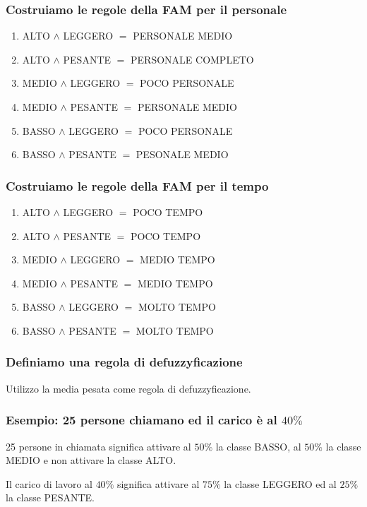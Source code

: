 \documentclass[\main/main.tex]{subfiles}
\begin{document}
\subsubsection*{Costruiamo le regole della FAM per il personale}
\begin{enumerate}
  \item ALTO  $\land$ LEGGERO $=$ PERSONALE MEDIO
  \item ALTO  $\land$ PESANTE $=$ PERSONALE COMPLETO
  \item MEDIO $\land$ LEGGERO $=$ POCO PERSONALE
  \item MEDIO $\land$ PESANTE $=$ PERSONALE MEDIO
  \item BASSO $\land$ LEGGERO $=$ POCO PERSONALE
  \item BASSO $\land$ PESANTE $=$ PESONALE MEDIO
\end{enumerate}

\subsubsection*{Costruiamo le regole della FAM per il tempo}
\begin{enumerate}
  \item ALTO  $\land$ LEGGERO $=$ POCO TEMPO
  \item ALTO  $\land$ PESANTE $=$ POCO TEMPO
  \item MEDIO $\land$ LEGGERO $=$ MEDIO TEMPO
  \item MEDIO $\land$ PESANTE $=$ MEDIO TEMPO
  \item BASSO $\land$ LEGGERO $=$ MOLTO TEMPO
  \item BASSO $\land$ PESANTE $=$ MOLTO TEMPO
\end{enumerate}

\subsubsection*{Definiamo una regola di defuzzyficazione}
Utilizzo la media pesata come regola di defuzzyficazione.

\subsubsection*{Esempio: 25 persone chiamano ed il carico è al $40\%$}
25 persone in chiamata significa attivare al $50\%$ la classe BASSO, al $50\%$ la classe MEDIO e non attivare la classe ALTO.

Il carico di lavoro al $40\%$ significa attivare al $75\%$ la classe LEGGERO ed al $25\%$ la classe PESANTE.
\end{document}
